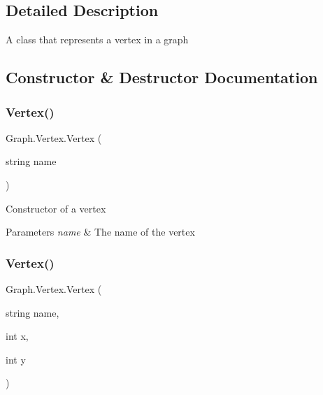 \subsection{Detailed Description}
A class that represents a vertex in a graph 



\subsection{Constructor \& Destructor Documentation}
\mbox{\label{class_graph_1_1_vertex_a65e1270ac657e57f3b4ed62434bc1a14}} 
\subsubsection{\texorpdfstring{Vertex()}{Vertex()}\hspace{0.1cm}{\footnotesize\ttfamily [1/2]}}
{\footnotesize\ttfamily Graph.\+Vertex.\+Vertex (\begin{DoxyParamCaption}\item[{string}]{name }\end{DoxyParamCaption})}



Constructor of a vertex 


\begin{DoxyParams}{Parameters}
{\em name} & The name of the vertex\\
\hline
\end{DoxyParams}
\mbox{\label{class_graph_1_1_vertex_ab0e830faa738a8c022a7c24b0f86ab9c}} 
\subsubsection{\texorpdfstring{Vertex()}{Vertex()}\hspace{0.1cm}{\footnotesize\ttfamily [2/2]}}
{\footnotesize\ttfamily Graph.\+Vertex.\+Vertex (\begin{DoxyParamCaption}\item[{string}]{name,  }\item[{int}]{x,  }\item[{int}]{y }\end{DoxyParamCaption})}



